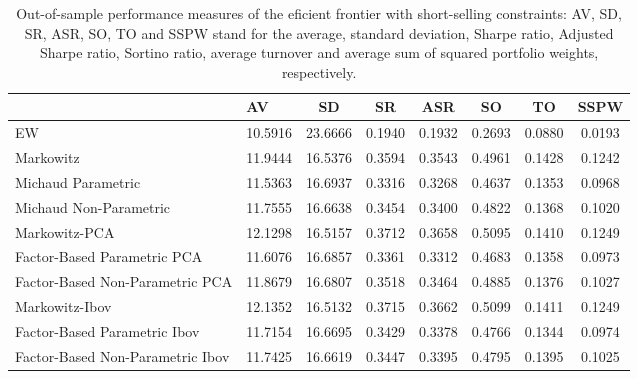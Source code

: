 \begin{table}

\caption{\label{tab:empirical_ef_2}Out-of-sample performance measures of the eficient frontier with short-selling constraints: AV, SD, SR, ASR, SO, TO and SSPW stand for the average, standard deviation, Sharpe ratio, Adjusted Sharpe ratio, Sortino ratio, average turnover and average sum of squared portfolio weights, respectively.}
\centering
\begin{tabular}[t]{l|l|c|c|c|c|c|c}
\hline
  & AV & SD & SR & ASR & SO & TO & SSPW\\
\hline
EW & 10.5916 & 23.6666 & 0.1940 & 0.1932 & 0.2693 & 0.0880 & 0.0193\\
\hline
Markowitz & 11.9444 & 16.5376 & 0.3594 & 0.3543 & 0.4961 & 0.1428 & 0.1242\\
\hline
Michaud Parametric & 11.5363 & 16.6937 & 0.3316 & 0.3268 & 0.4637 & 0.1353 & 0.0968\\
\hline
Michaud Non-Parametric & 11.7555 & 16.6638 & 0.3454 & 0.3400 & 0.4822 & 0.1368 & 0.1020\\
\hline
Markowitz-PCA & 12.1298 & 16.5157 & 0.3712 & 0.3658 & 0.5095 & 0.1410 & 0.1249\\
\hline
Factor-Based Parametric PCA & 11.6076 & 16.6857 & 0.3361 & 0.3312 & 0.4683 & 0.1358 & 0.0973\\
\hline
Factor-Based Non-Parametric PCA & 11.8679 & 16.6807 & 0.3518 & 0.3464 & 0.4885 & 0.1376 & 0.1027\\
\hline
Markowitz-Ibov & 12.1352 & 16.5132 & 0.3715 & 0.3662 & 0.5099 & 0.1411 & 0.1249\\
\hline
Factor-Based Parametric Ibov & 11.7154 & 16.6695 & 0.3429 & 0.3378 & 0.4766 & 0.1344 & 0.0974\\
\hline
Factor-Based Non-Parametric Ibov & 11.7425 & 16.6619 & 0.3447 & 0.3395 & 0.4795 & 0.1395 & 0.1025\\
\hline
\end{tabular}
\end{table}

